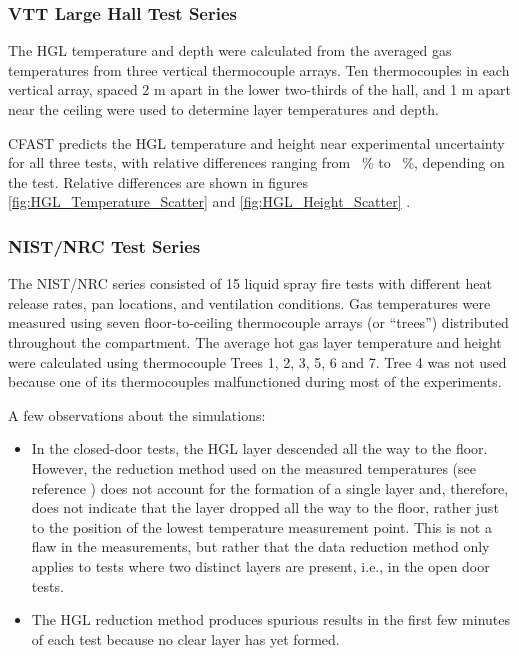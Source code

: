 \subsubsection{VTT Large Hall Test Series}


The HGL temperature and depth were calculated from the averaged gas temperatures from three vertical thermocouple arrays.  Ten thermocouples in each vertical array, spaced 2 m apart in the lower two-thirds of the hall, and 1 m apart near the ceiling were used to determine layer temperatures and depth.  

CFAST predicts the HGL temperature and height near experimental uncertainty for all three tests, with relative differences ranging from \HGLvttlow~\% to \HGLvtthi~\%, depending on the test. Relative differences are shown in figures \ref{fig:HGL_Temperature_Scatter} and \ref{fig:HGL_Height_Scatter} .

\subsubsection{NIST/NRC Test Series}

The NIST/NRC series consisted of 15 liquid spray fire tests with different heat release rates, pan locations, and ventilation conditions.  Gas temperatures were measured using seven floor-to-ceiling thermocouple arrays (or ``trees'') distributed throughout the compartment.  The average hot gas layer temperature and height were calculated using thermocouple Trees 1, 2, 3, 5, 6 and 7. Tree 4 was not used because one of its thermocouples malfunctioned during most of the experiments.  

A few observations about the simulations:
\begin{itemize}
\item In the closed-door tests, the HGL layer descended all the way to the floor.  However, the reduction method used on the measured temperatures (see reference \cite{McGrattan:2003}) does not account for the formation of a single layer and, therefore, does not indicate that the layer dropped all the way to the floor, rather just to the position of the lowest temperature measurement point.  This is not a flaw in the measurements, but rather that the data reduction method only applies to tests where two distinct layers are present, i.e., in the open door tests.
\item The HGL reduction method produces spurious results in the first few minutes of each test because no clear layer has yet formed.
\end{itemize}

